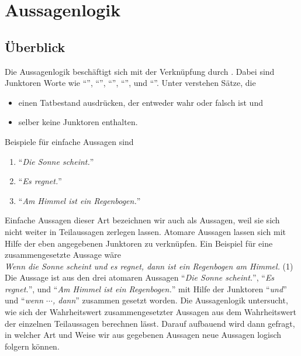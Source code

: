 \chapter{Aussagenlogik}
\section{Überblick}
Die Aussagenlogik beschäftigt sich mit der Verknüpfung  durch
.  Dabei sind Junktoren Worte wie ``'', ``'',
``'', ``'', und ``''.  Unter
 verstehen Sätze, die 
\begin{itemize}
\item einen Tatbestand ausdrücken, der entweder wahr oder falsch ist und 
\item selber keine Junktoren enthalten.
\end{itemize}
Beispiele für einfache Aussagen sind
\begin{enumerate}
\item ``\textsl{Die Sonne scheint.}''
\item ``\textsl{Es regnet.}''
\item ``\textsl{Am Himmel ist ein Regenbogen.}''
\end{enumerate}
Einfache Aussagen dieser Art bezeichnen wir auch als  Aussagen, weil sie sich nicht weiter in
Teilaussagen zerlegen lassen.  Atomare Aussagen lassen sich mit Hilfe der eben angegebenen Junktoren zu 
 verknüpfen.  Ein Beispiel für eine zusammengesetzte Aussage wäre \\[0.2cm]
\hspace*{1.3cm} \textsl{Wenn die Sonne scheint und es regnet, dann ist ein Regenbogen am Himmel.} 
\hspace*{\fill} (1)
\\[0.2cm]
Die Aussage ist aus den drei atomaren Aussagen ``\textsl{Die Sonne scheint.}'', ``\textsl{Es regnet.}'', und
``\textsl{Am Himmel ist ein Regenbogen.}'' mit Hilfe der Junktoren ``\textsl{und}'' und
``\textsl{wenn $\cdots$, dann}'' zusammen gesetzt worden.
Die Aussagenlogik untersucht, wie sich der Wahrheitswert zusammengesetzter Aussagen
aus dem Wahrheitswert der einzelnen Teilaussagen berechnen lässt.  Darauf
aufbauend wird dann gefragt, in welcher Art und Weise wir aus gegebenen Aussagen neue 
Aussagen logisch folgern können.


